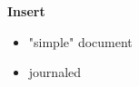 \documentclass[usenames,dvipsnames, 18pt, compress, aspectratio=169]{beamer}
\begin{document}





\begin{frame}
    \frametitle{}
    \begin{center}
        \textbf{Insert}
        \begin{itemize}[label={}]
            \item "simple" document
            \item journaled
        \end{itemize}
    \end{center}
\end{frame}
\end{document}
